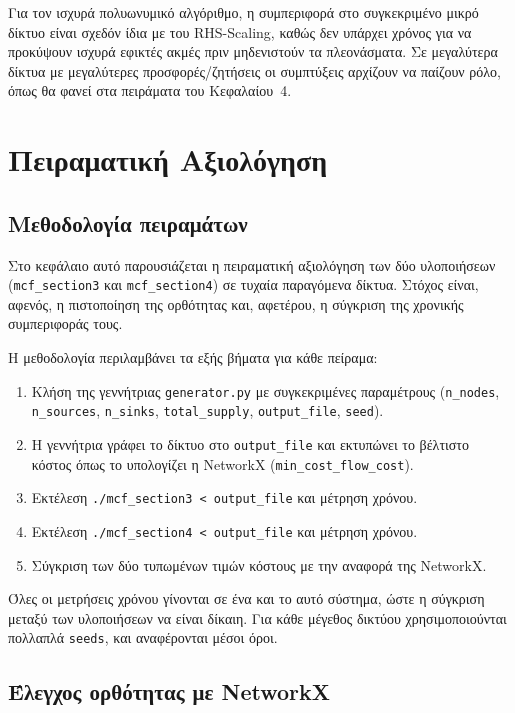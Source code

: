 \documentclass[11pt,a4paper,oneside]{report}
\begin{document}
Για τον ισχυρά πολυωνυμικό αλγόριθμο, η συμπεριφορά στο συγκεκριμένο μικρό δίκτυο είναι σχεδόν ίδια με του \textenglish{RHS-Scaling}, καθώς δεν υπάρχει χρόνος για να προκύψουν ισχυρά εφικτές ακμές πριν μηδενιστούν τα πλεονάσματα. Σε μεγαλύτερα δίκτυα με μεγαλύτερες προσφορές/ζητήσεις οι συμπτύξεις αρχίζουν να παίζουν ρόλο, όπως θα φανεί στα πειράματα του Κεφαλαίου~4.

\chapter{Πειραματική Αξιολόγηση}

\section{Μεθοδολογία πειραμάτων}

Στο κεφάλαιο αυτό παρουσιάζεται η πειραματική αξιολόγηση των δύο υλοποιήσεων (\texttt{mcf\_section3} και \texttt{mcf\_section4}) σε τυχαία παραγόμενα δίκτυα. Στόχος είναι, αφενός, η πιστοποίηση της ορθότητας και, αφετέρου, η σύγκριση της χρονικής συμπεριφοράς τους.

Η μεθοδολογία περιλαμβάνει τα εξής βήματα για κάθε πείραμα:
\begin{enumerate}
  \item Κλήση της γεννήτριας \texttt{generator.py} με συγκεκριμένες παραμέτρους (\texttt{n\_nodes}, \texttt{n\_sources}, \texttt{n\_sinks}, \texttt{total\_supply}, \texttt{output\_file}, \texttt{seed}).
  \item Η γεννήτρια γράφει το δίκτυο στο \texttt{output\_file} και εκτυπώνει το βέλτιστο κόστος όπως το υπολογίζει η \textenglish{NetworkX} (\texttt{min\_cost\_flow\_cost}).
  \item Εκτέλεση \texttt{./mcf\_section3 < output\_file} και μέτρηση χρόνου.
  \item Εκτέλεση \texttt{./mcf\_section4 < output\_file} και μέτρηση χρόνου.
  \item Σύγκριση των δύο τυπωμένων τιμών κόστους με την αναφορά της \textenglish{NetworkX}.
\end{enumerate}

Όλες οι μετρήσεις χρόνου γίνονται σε ένα και το αυτό σύστημα, ώστε η σύγκριση μεταξύ των υλοποιήσεων να είναι δίκαιη. Για κάθε μέγεθος δικτύου χρησιμοποιούνται πολλαπλά \texttt{seeds}, και αναφέρονται μέσοι όροι.



\section{Έλεγχος ορθότητας με \textenglish{NetworkX}}
\end{document}
